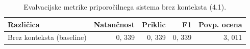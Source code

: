 \begin{table}[h]
\centering
\caption{Evalvacijske metrike priporočilnega sistema brez konteksta (4.1).}
\label{tab:evaluation_metrics_4_1}
\begin{tabular}{lrrrr}
\toprule
Različica & Natančnost & Priklic & F1 & Povp. ocena \\
\midrule
Brez konteksta (baseline) & 0, 339 & 0, 339 & 0, 339 & 3, 011 \\
\bottomrule
\end{tabular}

\end{table}
